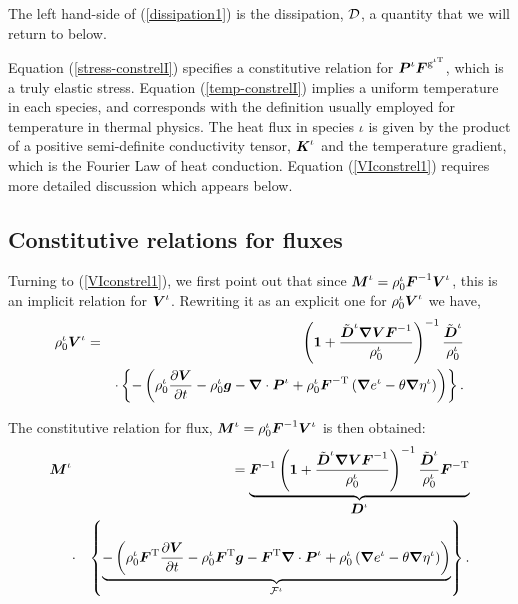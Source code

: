 \noindent The left hand-side of (\ref{dissipation1}) is the
dissipation, ${\mathcal D}$, a quantity that we will return to below.

Equation (\ref{stress-constrelI}) specifies a constitutive
relation for $\mbox{\boldmath$ P$}^\iota\mbox{\boldmath$ F$}^{\mathrm{g}^{\iota\mathrm{T}}}$, which
is a truly elastic stress. Equation (\ref{temp-constrelI}) implies
a uniform temperature in each species, and corresponds with the
definition usually employed for temperature in thermal physics.
The heat flux in species $\iota$ is given by the product of a
positive semi-definite conductivity tensor, ${\mbox{\boldmath$ K$}}^\iota$ and the
temperature gradient, which is the Fourier Law of heat conduction.
Equation (\ref{VIconstrel1}) requires more detailed discussion
which appears below.

\subsection{Constitutive relations for fluxes}\label{sect5.1}

Turning to (\ref{VIconstrel1}), we first point out that since
$\mbox{\boldmath$ M$}^\iota = \rho_0^\iota\mbox{\boldmath$ F$}^{-1}\mbox{\boldmath$ V$}^\iota$, this is an implicit
relation for $\mbox{\boldmath$ V$}^\iota$. Rewriting it as an explicit one for
$\rho^\iota_0\mbox{\boldmath$ V$}^\iota$ we have,
\begin{eqnarray}
\rho^\iota_0\mbox{\boldmath$ V$}^\iota =& &\left({\bf 1} +
\frac{\tilde{\mbox{\boldmath$ D$}}^\iota\mbox{\boldmath$\nabla$}\mbox{\boldmath$ V$}\mbox{\boldmath$ F$}^{-1}}{\rho^\iota_0}\right)^{-1}\frac{\tilde{\mbox{\boldmath$ D$}}^\iota}{\rho^\iota_0}\nonumber\\
& &\cdot\left\{-\left(\rho^\iota_0\frac{\partial\mbox{\boldmath$ V$}}{\partial t} -
\rho_0^\iota\mbox{\boldmath$ g$} - \mbox{\boldmath$\nabla$}\cdot\mbox{\boldmath$ P$}^\iota +
\rho^\iota_0\mbox{\boldmath$ F$}^{-\mathrm{T}}\left(\mbox{\boldmath$\nabla$} e^\iota -
\theta\mbox{\boldmath$\nabla$}\eta^\iota\right)\right)\right\}. \label{VIconstrel2}
\end{eqnarray}

\noindent The constitutive relation for flux, $\mbox{\boldmath$ M$}^\iota =
\rho^\iota_0\mbox{\boldmath$ F$}^{-1}\mbox{\boldmath$ V$}^\iota$ is then obtained:
\begin{eqnarray}
\mbox{\boldmath$ M$}^\iota & &=\underbrace{\mbox{\boldmath$ F$}^{-1}\left({\bf 1} +
\frac{\tilde{\mbox{\boldmath$ D$}}^\iota\mbox{\boldmath$\nabla$}\mbox{\boldmath$ V$}\mbox{\boldmath$ F$}^{-1}}{\rho^\iota_0}\right)^{-1}\frac{\tilde{\mbox{\boldmath$ D$}}^\iota}{\rho^\iota_0}\mbox{\boldmath$ F$}^{-\mathrm{T}}}_{\mbox{\boldmath$ D$}^\iota}\nonumber\\
&\cdot&\left\{\underbrace{-\left(\rho^\iota_0\mbox{\boldmath$ F$}^\mathrm{T}\frac{\partial\mbox{\boldmath$ V$}}{\partial
t} - \rho_0^\iota\mbox{\boldmath$ F$}^\mathrm{T}\mbox{\boldmath$ g$} -
\mbox{\boldmath$ F$}^\mathrm{T}\mbox{\boldmath$\nabla$}\cdot\mbox{\boldmath$ P$}^\iota + \rho^\iota_0\left(\mbox{\boldmath$\nabla$}
e^\iota -
\theta\mbox{\boldmath$\nabla$}\eta^\iota\right)\right)}_{\boldmath{{\mathcal F}}^\iota}\right\}.
\label{MIconstrel}
\end{eqnarray}

